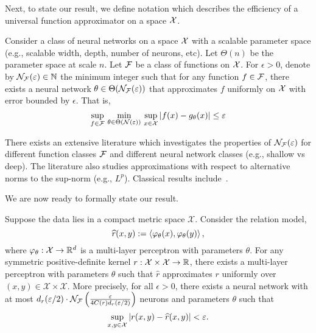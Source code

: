 Next, to state our result, we define notation which describes the efficiency of a universal function approximator on a space ${\mathcal{X}}$.
\begin{definition}\label{def:univ_approx_efficiency}
	Consider a class of neural networks on a space ${\mathcal{X}}$ with a scalable parameter space (e.g., scalable width, depth, number of neurons, etc). Let $\Theta(n)$ be the parameter space at scale $n$. Let ${\mathcal{F}}$ be a class of functions on ${\mathcal{X}}$. For $\epsilon > 0$, denote by ${\mathcal{N}}_{\mathcal{F}}(\varepsilon) \in \mathbb{N}$ the minimum integer such that for any function $f \in {\mathcal{F}}$, there exists a neural network $\theta \in \Theta({\mathcal{N}}_{\mathcal{F}}(\varepsilon))$ that approximates $f$ uniformly on ${\mathcal{X}}$ with error bounded by $\epsilon$. That is,
	\begin{equation*}
		\sup_{f \in \calF} \, \min_{\theta \in \Theta(\calN(\epsilon))} \,  \sup_{x \in \calX} \abs{f(x) - g_\theta(x)} \leq \epsilon
	\end{equation*}
\end{definition}

There exists an extensive literature which investigates the properties of ${\mathcal{N}}_{\mathcal{F}}(\varepsilon)$ for different function classes ${\mathcal{F}}$ and different neural network classes (e.g., shallow vs deep). The literature also studies approximations with respect to alternative norms to the sup-norm (e.g., $L^p$). Classical results include~\parencite{cybenkoApproximationSuperpositions1989,barronUniversalApproximation1993,hornikMultilayerFeedforward1989}.

We are now ready to formally state our result.

\begin{theorem}\label{theorem:symmetric_inner_prod_rels_func_class}
	\hphantom{~}

	Suppose the data lies in a compact metric space \(\mathcal{X}\). Consider the relation model,
	\begin{equation*}
		\hat{r}(x, y) := \iprod{\phi_{\theta}(x)}{\phi_{\theta}(y)},
	\end{equation*}
	where $\varphi_{\theta}: {\mathcal{X}} \to \mathbb{R}^d$ is a multi-layer perceptron with parameters $\theta$.
	For any symmetric positive-definite kernel $r: {\mathcal{X}} \times {\mathcal{X}} \to \mathbb{R}$, there exists a multi-layer perceptron with parameters $\theta$ such that $\hat{r}$ approximates $r$ uniformly over \((x,y) \in \mathcal{X}\times\mathcal{X}\). More precisely, for all \(\epsilon > 0\), there exists a neural network with at most $d_r(\varepsilon / 2) \cdot {\mathcal{N}}_{\mathcal{F}}\left(\frac{\varepsilon}{4 C(r) d_r(\varepsilon / 2)}\right)$ neurons and parameters $\theta$ such that
    \[\sup_{x,y \in \mathcal{X}}{\left\lvert r(x,y) - \widehat{r}(x,y)\right\rvert} < \varepsilon.\]
\end{theorem}

